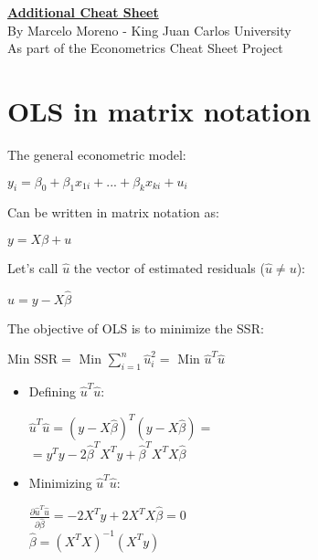 \documentclass[10pt, a4paper, landscape]{extarticle}
\newcommand{\SSR}{\mathrm{SSR}}
\begin{document}
\setlength{\footskip}{12pt}

\begin{multicols}{3} %

\begin{center}
	\textbf{\LARGE \href{https://github.com/marcelomijas/econometrics-cheatsheet}{Additional Cheat Sheet}} \\
	{\footnotesize By Marcelo Moreno - King Juan Carlos University} \\
	{\footnotesize As part of the Econometrics Cheat Sheet Project}
\end{center}

\section*{OLS in matrix notation}
	The general econometric model:
	\begin{center}
		$y_i = \beta_0 + \beta_1 x_{1i} + ... + \beta_k x_{ki} + u_i$
	\end{center}
	Can be written in matrix notation as:
	\begin{center}
		$y = X \beta + u$
	\end{center}
	Let's call $\hat{u}$ the vector of estimated residuals ($\hat{u} \neq u$):
	\begin{center}
		$\hat{u} = y - X \hat{\beta}$
	\end{center}
	The objective of OLS is to minimize the SSR:
	\begin{center}
		Min $\SSR =$ Min $\sum_{i=1}^n \hat{u}_i^2 = $ Min $\hat{u}^T \hat{u}$
	\end{center}
	\begin{itemize}[leftmargin=*]
		\item Defining $\hat{u}^T \hat{u}$:
		\begin{center}
			$\hat{u}^T \hat{u} = (y - X \hat{\beta})^T (y - X \hat{\beta}) =$ \\
			$= y^T y -2 \hat{\beta}^T X^T y + \hat{\beta}^T X^T X \hat{\beta}$
		\end{center}
		\item Minimizing $\hat{u}^T \hat{u}$:
		\begin{center}
			$\frac{\partial \hat{u}^T \hat{u}}{\partial \hat{\beta}} = -2 X^T y +2 X^T X \hat{\beta} = 0$ \\
			$\hat{\beta} = (X^T X)^{-1} (X^T y)$ \\

\end{center}
\end{itemize}
\end{multicols}
\end{document}
